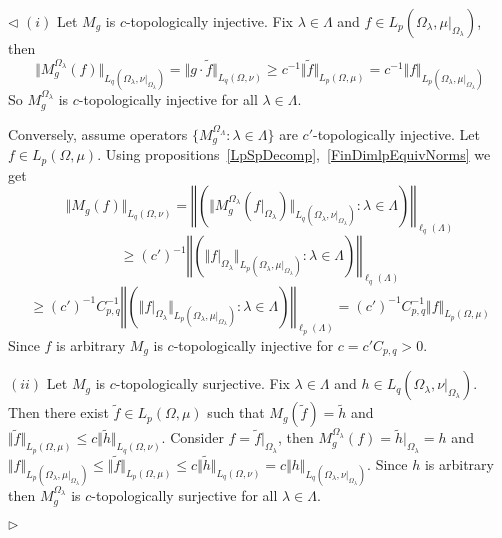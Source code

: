 \documentclass[12pt]{article}
\newenvironment{proof}{\par $\triangleleft$}{$\triangleright$}
\begin{document}
\begin{proof}
    $(i)$ Let $M_g$ is $c$-topologically injective. Fix $\lambda\in\Lambda$ and
    $f\in L_p(\Omega_\lambda,\mu|_{\Omega_\lambda})$, then
    $$
        \Vert
        M_g^{\Omega_\lambda}(f)
        \Vert_{L_q(\Omega_\lambda,\nu|_{\Omega_\lambda})}
        =\Vert g\cdot \widetilde{f}\Vert_{L_q(\Omega,\nu)}
        \geq c^{-1}\Vert\widetilde{f}\Vert_{L_p(\Omega,\mu)}
        =c^{-1}\Vert f\Vert_{L_p(\Omega_\lambda,\mu|_{\Omega_\lambda})}
    $$
    So $M_g^{\Omega_\lambda}$ is $c$-topologically injective for all
    $\lambda\in\Lambda$.

    Conversely, assume operators $ \{M_g^{\Omega_\Lambda}:\lambda\in\Lambda \}$
    are $c'$-topologically injective. Let $f\in L_p(\Omega,\mu)$. Using
    propositions~\ref{LpSpDecomp},~\ref{FinDimlpEquivNorms} we get
    $$
        \Vert M_g(f)\Vert_{L_q(\Omega,\nu)}
        =\left\Vert\left(
        \Vert M_g^{\Omega_\lambda}
        (f|_{\Omega_\lambda})\Vert_{
        L_q(\Omega_\lambda,\nu|_{\Omega_\lambda})}:
        \lambda\in\Lambda\right)
        \right\Vert_{\ell_q(\Lambda)}
    $$
    $$
        \geq {(c')}^{-1}\left\Vert\left(
        \Vert f|_{\Omega_\lambda}\Vert_{
        L_p(\Omega_\lambda,\mu|_{\Omega_\lambda})}
        :\lambda\in\Lambda\right)
        \right\Vert_{\ell_q(\Lambda)}
    $$
    $$
        \geq {(c')}^{-1} C_{p,q}^{-1}\left\Vert\left(
        \Vert f|_{\Omega_\lambda}\Vert_{
        L_p(\Omega_\lambda,\mu|_{\Omega_\lambda})}:
        \lambda\in\Lambda\right)
        \right\Vert_{\ell_p(\Lambda)}
        ={(c')}^{-1}C_{p,q}^{-1}\Vert f\Vert_{L_p(\Omega,\mu)}
    $$
    Since $f$ is arbitrary $M_g$ is $c$-topologically injective for
    $c=c'C_{p,q}>0$.

    $(ii)$ Let $M_g$ is $c$-topologically surjective. Fix $\lambda\in\Lambda$
    and $h\in L_q(\Omega_\lambda,\nu|_{\Omega_\lambda})$. Then there exist
    $\widetilde{f}\in L_p(\Omega,\mu)$ such that
    $M_g(\widetilde{f})=\widetilde{h}$ and $\Vert
        \widetilde{f}\Vert_{L_p(\Omega,\mu)}\leq c\Vert
        \widetilde{h}\Vert_{L_q(\Omega,\nu)}$. Consider
    $f=\widetilde{f}|_{\Omega_\lambda}$, then
    $M_g^{\Omega_\lambda}(f)=\widetilde{h}|_{\Omega_\lambda}=h$ and $\Vert
        f\Vert_{L_p(\Omega_\lambda,\mu|_{\Omega_\lambda})}\leq \Vert
        \widetilde{f}\Vert_{L_p(\Omega,\mu)}\leq
        c\Vert\widetilde{h}\Vert_{L_q(\Omega,\nu)}=c\Vert
        h\Vert_{L_q(\Omega_\lambda,\nu|_{\Omega_\lambda})}$.
    Since $h$  is arbitrary then $M_g^{\Omega_\lambda}$ is $c$-topologically
    surjective for all $\lambda\in\Lambda$.


\end{proof}
\end{document}
